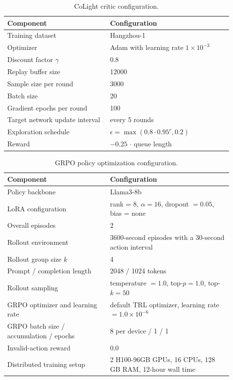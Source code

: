 \begin{table}[t]
    \centering
    \caption{CoLight critic configuration.}
    \label{tab:critic_training_config}
    \small
    \begin{tabular}{p{0.42\linewidth}p{0.5\linewidth}}
        \toprule
        Component & Configuration \\
        \midrule
        Training dataset & Hangzhou-1 \\
        Optimizer & Adam with learning rate $1 \times 10^{-3}$ \\
        Discount factor $\gamma$ & 0.8 \\
        Replay buffer size & 12000 \\
        Sample size per round & 3000 \\
        Batch size & 20 \\
        Gradient epochs per round & 100 \\
        Target network update interval & every 5 rounds \\
        Exploration schedule & $\epsilon = \max(0.8 \cdot 0.95^r, 0.2)$ \\
        Reward & $-0.25 \,\cdot\,$queue length \\
        \bottomrule
    \end{tabular}
\end{table}

\begin{table}[t]
    \centering
    \caption{GRPO policy optimization configuration.}
    \label{tab:grpo_training_config}
    \small
    \begin{tabular}{p{0.42\linewidth}p{0.5\linewidth}}
        \toprule
        Component & Configuration \\
        \midrule
        Policy backbone & Llama3-8b \\
        LoRA configuration & rank = $8$, $\alpha = 16$, dropout $= 0.05$, bias = none \\
        Overall episodes & 2 \\
        \midrule
        Rollout environment & 3600-second episodes with a 30-second action interval \\
        Rollout group size $k$ & 4 \\
        Prompt / completion length & 2048 / 1024 tokens \\
        Rollout sampling & temperature $= 1.0$, top-$p = 1.0$, top-$k = 50$ \\
        \midrule
        GRPO optimizer and learning rate & default TRL optimizer, learning rate $= 1.0 \times 10^{-6}$ \\
        GRPO batch size / accumulation / epochs & 8 per device / 1 / 1 \\
        Invalid-action reward & 0.0 \\
        Distributed training setup & 2 H100-96GB GPUs, 16 CPUs, 128 GB RAM, 12-hour wall time \\
        \bottomrule
    \end{tabular}
\end{table}

